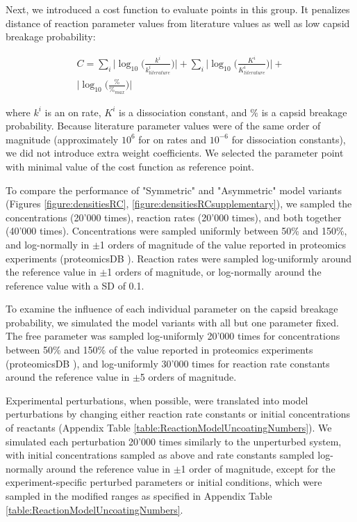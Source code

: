 Next, we introduced a cost function to evaluate points in this group. It penalizes distance of reaction parameter values from literature values as well as low capsid breakage probability:

\begin{equation}
\begin{split}
C = \sum_{i} \big| \log_{10} \big( \frac{k^i}{k^i_{literature}} \big) \big| +
\sum_{i} \big| \log_{10} \big( \frac{K^i}{K^i_{literature}} \big) \big| + \\
\big| \log_{10} \big( \frac{\%}{\%_{max}} \big) \big|
\end{split}
\end{equation}

where $k^i$ is an on rate, $K^i$ is a dissociation constant, and $\%$ is a capsid breakage probability. Because literature parameter values were of the same order of magnitude (approximately $10^6$ for on rates and $10^{-6}$ for dissociation constants), we did not introduce extra weight coefficients. We selected the parameter point with minimal value of the cost function as reference point.

To compare the performance of "Symmetric" and "Asymmetric" model variants (Figures \ref{figure:densitiesRC}, \ref{figure:densitiesRCsupplementary}), we sampled the concentrations (20’000 times), reaction rates (20’000 times), and both together (40’000 times). Concentrations were sampled uniformly between 50\% and 150\%, and log-normally in $\pm$1 orders of magnitude of the value reported in proteomics experiments (proteomicsDB \cite{schmidt2018proteomicsdb}). Reaction rates were sampled log-uniformly around the reference value in $\pm$1 orders of magnitude, or log-normally around the reference value with a SD of 0.1.

To examine the influence of each individual parameter on the capsid breakage probability, we simulated the model variants with all but one parameter fixed. The free parameter was sampled log-uniformly 20’000 times for concentrations between 50\% and 150\% of the value reported in proteomics experiments (proteomicsDB \cite{schmidt2018proteomicsdb}), and log-uniformly 30’000 times for reaction rate constants around the reference value in $\pm$5 orders of magnitude.

Experimental perturbations, when possible, were translated into model perturbations by changing either reaction rate constants or initial concentrations of reactants (Appendix Table \ref{table:ReactionModelUncoatingNumbers}). We simulated each perturbation 20’000 times similarly to the unperturbed system, with initial concentrations sampled as above and rate constants sampled log-normally around the reference value in $\pm$1 order of magnitude, except for the experiment-specific perturbed parameters or initial conditions, which were sampled in the modified ranges as specified in Appendix Table \ref{table:ReactionModelUncoatingNumbers}.

